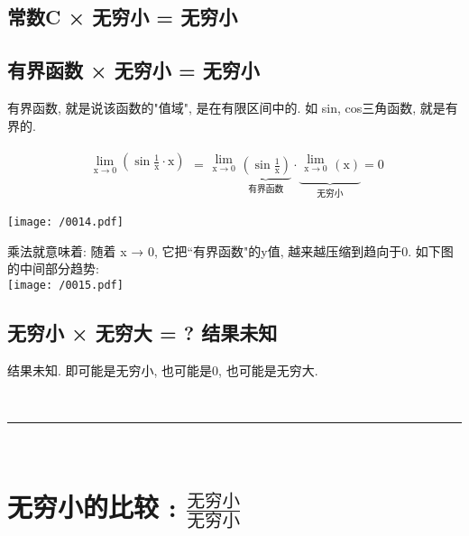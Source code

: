 \documentclass[UTF8]{ctexart}
\begin{document}
\subsection{常数C × 无穷小 = 无穷小 } 

\subsection{有界函数 × 无穷小 = 无穷小 } 

有界函数, 就是说该函数的"值域", 是在有限区间中的. 如 sin, cos三角函数, 就是有界的.

\begin{myEnvSample}
	\begin{align*}  %
		\begin{matrix}
			\lim_{\text{x}\rightarrow 0}\left( \sin \frac{1}{\text{x}}\cdot \text{x} \right)\\
		\end{matrix}=\begin{matrix}
			\lim_{\text{x}\rightarrow 0}\\
		\end{matrix}\underset{\text{有界函数}}{\underbrace{\left( \sin \frac{1}{\text{x}} \right) }}\cdot \underset{\text{无穷小}}{\underbrace{\begin{matrix}
					\lim_{\text{x}\rightarrow 0}\\
				\end{matrix}\left( \text{x} \right) }}=0 
	\end{align*}
	
	\texttt{[image: /0014.pdf]}
	
	乘法就意味着: 随着 x → 0, 它把``有界函数"的y值, 越来越压缩到趋向于0. 如下图的中间部分趋势: \\
	
	\texttt{[image: /0015.pdf]}
\end{myEnvSample}


\subsection{无穷小 × 无穷大 = ?  结果未知} 

结果未知. 即可能是无穷小, 也可能是0, 也可能是无穷大.



~\\
\hrule
~\\


\section{无穷小的比较 : $ \frac{\text{无穷小}} {\text{无穷小}}$ }
\end{document}
